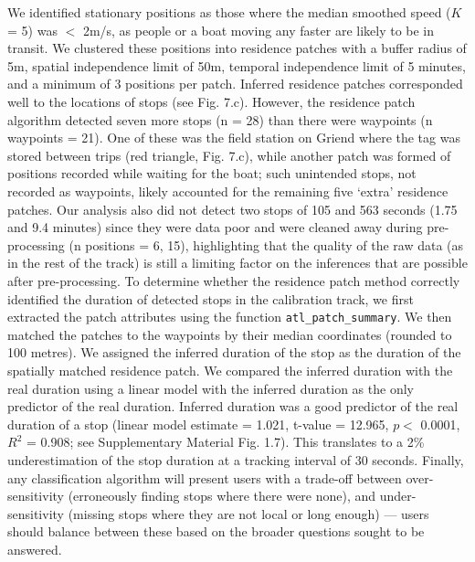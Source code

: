 \begin{refsection}
    We identified stationary positions as those where the median smoothed speed ($K$ = 5) was $<$ 2m/s, as people or a boat moving any faster are likely to be in transit.
    We clustered these positions into residence patches with a buffer radius of 5m, spatial independence limit of 50m, temporal independence limit of 5 minutes, and a minimum of 3 positions per patch.
    Inferred residence patches corresponded well to the locations of stops (see Fig. 7.c).
    However, the residence patch algorithm detected seven more stops (n = 28) than there were waypoints (n waypoints = 21).
    One of these was the field station on Griend where the tag was stored between trips (red triangle, Fig. 7.c), while another patch was formed of positions recorded while waiting for the boat; such unintended stops, not recorded as waypoints, likely accounted for the remaining five `extra' residence patches.
    Our analysis also did not detect two stops of 105 and 563 seconds (1.75 and 9.4 minutes) since they were data poor and were cleaned away during pre-processing (n positions = 6, 15), highlighting that the quality of the raw data (as in the rest of the track) is still a limiting factor on the inferences that are possible after pre-processing.
    To determine whether the residence patch method correctly identified the duration of detected stops in the calibration track, we first extracted the patch attributes using the function \texttt{atl\_patch\_summary}.
    We then matched the patches to the waypoints by their median coordinates (rounded to 100 metres).
    We assigned the inferred duration of the stop as the duration of the spatially matched residence patch.
    We compared the inferred duration with the real duration using a linear model with the inferred duration as the only predictor of the real duration.
    Inferred duration was a good predictor of the real duration of a stop (linear model estimate = 1.021, t-value = 12.965, $p <$ 0.0001, $R^2$ = 0.908; see Supplementary Material Fig. 1.7).
    This translates to a 2\% underestimation of the stop duration at a tracking interval of 30 seconds.
    Finally, any classification algorithm will present users with a trade-off between over-sensitivity (erroneously finding stops where there were none), and under-sensitivity (missing stops where they are not local or long enough) --- users should balance between these based on the broader questions sought to be answered.


\end{refsection}
